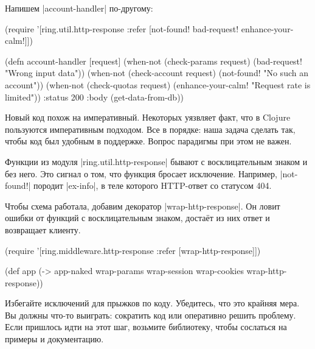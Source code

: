 \noindent
Напишем \spverb|account-handler| по-другому:


\begin{english}
  \begin{clojure}
(require '[ring.util.http-response
           :refer [not-found!
                   bad-request!
                   enhance-your-calm!]])

(defn account-handler [request]
  (when-not (check-params request)
    (bad-request! "Wrong input data"))
  (when-not (check-account request)
    (not-found! "No such an account"))
  (when-not (check-quotas request)
    (enhance-your-calm! "Request rate is limited"))
  {:status 200
   :body (get-data-from-db)})
  \end{clojure}
\end{english}

Новый код похож на императивный. Некоторых уязвляет факт, что в Clojure
пользуются императивным подходом. Все в порядке: наша задача сделать так, чтобы
код был удобным в поддержке. Вопрос парадигмы при этом не важен.

Функции из модуля \spverb|ring.util.http-response| бывают с восклицательным
знаком и без него. Это сигнал о том, что функция бросает исключение. Например,
\spverb|not-found!| породит \spverb|ex-info|, в теле которого HTTP-ответ со
статусом 404.


Чтобы схема работала, добавим декоратор \spverb|wrap-http-response|. Он ловит
ошибки от функций с восклицательным знаком, доста\"{е}т из них ответ и
возвращает клиенту.

\begin{english}
  \begin{clojure}
(require '[ring.middleware.http-response
           :refer [wrap-http-response]])

(def app
  (-> app-naked
      wrap-params
      wrap-session
      wrap-cookies
      wrap-http-response))
  \end{clojure}
\end{english}

Избегайте исключений для прыжков по коду. Убедитесь, что это крайняя мера. Вы
должны что-то выиграть: сократить код или оперативно решить проблему. Если
пришлось идти на этот шаг, возьмите библиотеку, чтобы сослаться на примеры и
документацию.


